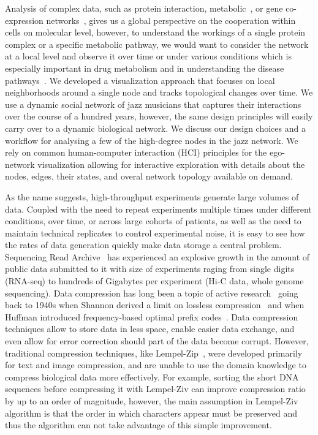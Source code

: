 
Analysis of complex data, such as protein interaction, metabolic~\cite{metabolic}, or gene co-expression networks~\cite{Stuart2003}, gives us a global perspective on the cooperation within cells on molecular level, however, to understand the workings of a single protein complex or a specific metabolic pathway, we would want to consider the network at a local level and observe it over time or under various conditions which is especially important in drug metabolism and in understanding the disease pathways~\cite{Amar2013,Pharmacogenomics}. We developed a visualization approach that focuses on local neighborhoods around a single node and tracks topological changes over time. We use a dynamic social network of jazz musicians that captures their interactions over the course of a hundred years, however, the same design principles will easily carry over to a dynamic biological network. We discuss our design choices and a workflow for analysing a few of the high-degree nodes in the jazz network. We rely on common human-computer interaction (HCI) principles for the ego-network visualization allowing for interactive  exploration with details about the nodes, edges, their states, and overal network topology available on demand.


As the name suggests, high-throughput experiments generate large volumes of  data. Coupled with the need to repeat experiments multiple times under different conditions, over time, or across large cohorts of patients, as well as the need to maintain technical replicates to control experimental noise, it is easy to see how the rates of data generation quickly make data storage a central problem. Sequencing Read Archive~\cite{SRA} has experienced an explosive growth in the amount of public data submitted to it with size of experiments raging from single digits (RNA-seq) to hundreds of Gigabytes per experiment (Hi-C data, whole genome sequencing). Data compression has long been a topic of active research~\cite{Deorowicz2013b} going back to 1940s when Shannon derived a limit on lossless compression~\cite{Shannon1948} and when Huffman introduced frequency-based optimal prefix codes~\cite{Huffman1952}. Data compression techniques allow to store data in less space, enable easier data exchange, and even allow for error correction should part of the data become corrupt. However, traditional compression techniques, like Lempel-Zip~\cite{LempelZiv77}, were developed primarily for text and image compression, and are unable to use the domain knowledge to compress biological data more effectively. For example, sorting the short DNA sequences before compressing it with Lempel-Ziv can improve compression ratio by up to an order of magnitude, however, the main assumption in Lempel-Ziv algorithm is that the order in which characters appear must be preserved and thus the algorithm can not take advantage of this simple improvement. 

